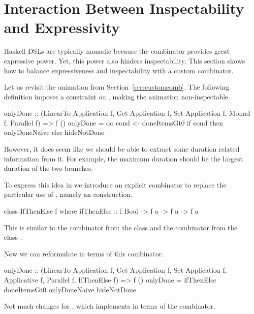 \section{Interaction Between Inspectability and Expressivity}
\label{sec:interaction}

Haskell DSLs are typically monadic because the \hs{>>=} combinator provides
great expressive power. Yet, this power also hinders inspectability. This section shows how to balance 
expressiveness and inspectability with a custom combinator.

Let us revisit the  animation from Section~\ref{sec:customcomb}. The following definition imposes a  constraint on , making the animation non-inspectable.

\begin{spec}
onlyDone :: (LinearTo Application f, Get Application f,
  Set Application f, Monad f, Parallel f) => f ()
onlyDone = do
  cond <- doneItemsGt0
  if cond then onlyDoneNaive else hideNotDone
\end{spec}

However, it does seem like we should be able to extract some duration related
information from it. For example, the maximum duration should be the largest
duration of the two branches.

To express this idea in \dsl{} we introduce an explicit combinator to replace
the particular use of \hs{>>=}, namely an  construction. 

\begin{code}
class IfThenElse f where
  ifThenElse :: f Bool -> f a -> f a -> f a
\end{code}

This is similar to the  combinator from the  class
\cite{DBLP:phd/ethos/Yallop10} and the  combinator from the
 class \cite{Mokhov:2019:SAF:3352468.3341694}.

Now we can reformulate  in terms of this  combinator.

\begin{code}
onlyDone :: (LinearTo Application f, Get Application f,
  Set Application f, Applicative f, Parallel f, IfThenElse f)
  => f ()
onlyDone = ifThenElse doneItemsGt0 onlyDoneNaive hideNotDone
\end{code}

Not much changes for , which implements  in terms of
the \hs{>>=} combinator. 

